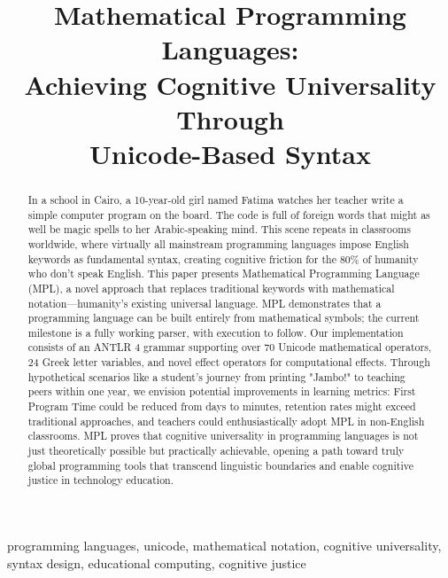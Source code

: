 \documentclass[10pt,conference]{IEEEtran}
\begin{document}
\title{Mathematical Programming Languages:\\
Achieving Cognitive Universality Through\\
Unicode-Based Syntax}

\author{
}

\maketitle

\begin{abstract}
In a school in Cairo, a 10-year-old girl named Fatima watches her teacher write a simple computer program on the board. The code is full of foreign words that might as well be magic spells to her Arabic-speaking mind. This scene repeats in classrooms worldwide, where virtually all mainstream programming languages impose English keywords as fundamental syntax, creating cognitive friction for the 80\% of humanity who don't speak English. This paper presents Mathematical Programming Language (MPL), a novel approach that replaces traditional keywords with mathematical notation—humanity's existing universal language. MPL demonstrates that a programming language can be built entirely from mathematical symbols; the current milestone is a fully working parser, with execution to follow. Our implementation consists of an ANTLR 4 grammar supporting over 70 Unicode mathematical operators, 24 Greek letter variables, and novel effect operators for computational effects. Through hypothetical scenarios like a student's journey from printing "Jambo!" to teaching peers within one year, we envision potential improvements in learning metrics: First Program Time could be reduced from days to minutes, retention rates might exceed traditional approaches, and teachers could enthusiastically adopt MPL in non-English classrooms. MPL proves that cognitive universality in programming languages is not just theoretically possible but practically achievable, opening a path toward truly global programming tools that transcend linguistic boundaries and enable cognitive justice in technology education.
\end{abstract}

\begin{IEEEkeywords}
programming languages, unicode, mathematical notation, cognitive universality, syntax design, educational computing, cognitive justice
\end{IEEEkeywords}
\end{document}
